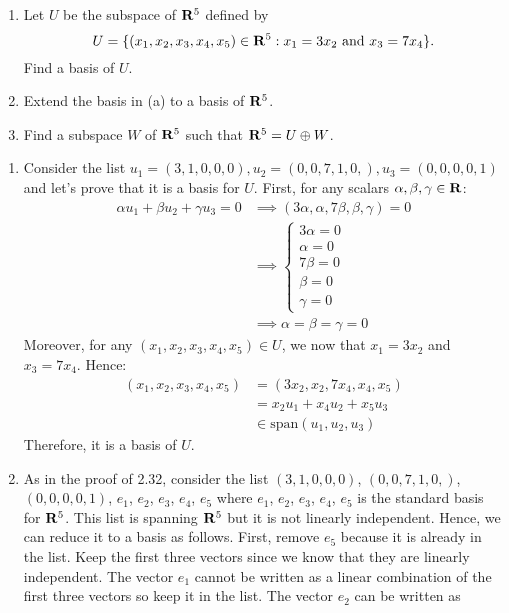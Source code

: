 \begin{exercise}
    \vspace{-0.6cm}
    \begin{enumerate}[label=(\alph*)]
        \item Let $U$ be the subspace of $\mathbf{R}^5$ defined by
        $$U = \{(x_1, x_2, x_3, x_4, x_5) \in \mathbf{R}^5 : x_1 = 3x_2 \text{ and } x_3 = 7x_4\}.$$
        Find a basis of $U$.
        \item Extend the basis in (a) to a basis of $\mathbf{R}^5$.
        \item Find a subspace $W$ of $\mathbf{R}^5$ such that $\mathbf{R}^5 = U \oplus W$. \\
    \end{enumerate}
\end{exercise}

\begin{solution}
    \begin{enumerate}[label=(\alph*)]
        \item Consider the list $u_1 = (3,1, 0,0,0), u_2 = (0,0,7,1,0,), u_3 = (0,0,0,0,1)$ and let's prove that it is a basis for $U$. First, for any scalars $\alpha, \beta, \gamma \in \mathbf{R}$:
        \begin{align*}
            \alpha u_1 + \beta u_2 + \gamma u_3 = 0 &\implies (3\alpha, \alpha, 7\beta, \beta, \gamma) = 0 \\
            &\implies \begin{cases}
                3\alpha = 0 \\ \alpha = 0 \\ 7 \beta = 0 \\ \beta = 0 \\ \gamma = 0
            \end{cases} \\
            &\implies \alpha = \beta = \gamma = 0
        \end{align*}
        Moreover, for any $(x_1, x_2, x_3, x_4, x_5) \in U$, we now that $x_1 = 3x_2$ and $x_3 = 7x_4$. Hence:
        \begin{align*}
            (x_1, x_2, x_3, x_4, x_5) &= (3x_2, x_2, 7x_4, x_4, x_5) \\
            &= x_2u_1 + x_4u_2 + x_5 u_3 \\
            &\in \text{span}(u_1, u_2, u_3)
        \end{align*}
        Therefore, it is a basis of $U$.
        \item As in the proof of 2.32, consider the list $(3,1, 0,0,0)$, $(0,0,7,1,0,)$, $(0,0,0,0,1)$, $e_1$, $e_2$, $e_3$, $e_4$, $e_5$ where $e_1$, $e_2$, $e_3$, $e_4$, $e_5$ is the standard basis for $\mathbf{R}^5$. This list is spanning $\mathbf{R}^5$ but it is not linearly independent. Hence, we can reduce it to a basis as follows. First, remove $e_5$ because it is already in the list. Keep the first three vectors since we know that they are linearly independent. The vector $e_1$ cannot be written as a linear combination of the first three vectors so keep it in the list. The vector $e_2$ can be written as

\end{enumerate}
\end{solution}
